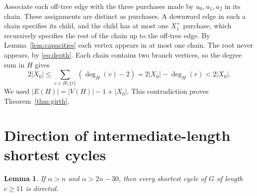 \documentclass[11pt]{article}
\newtheorem{lemma}[theorem]{Lemma}
\newcommand{\abs}[1]{\left|#1\right|}
\begin{document}
Associate each off-tree edge with the three purchases made
by \(u_0,u_1,u_2\) in its chain. These assignments are distinct
as purchases. A downward edge in such a chain specifies its child,
and the child has at most one \(X_1^+\) purchase, which recursively
specifies the rest of the chain up to the off-tree edge. By
Lemma~\ref{lem:capacities} each vertex appears in at most one chain.
The root never appears, by \eqref{eq:depth}. Each chain contains
two branch vertices, so the degree sum in \(H\) gives
\[
 2\abs{X_0} \le \sum_{v\in H\setminus\{r\}}(\deg_H(v)-2)
 =2\abs{X_0}-\deg_H(r)<2\abs{X_0}.
\]
We used \(\abs{E(H)}=\abs{V(H)}-1+\abs{X_0}\).
This contradiction proves Theorem~\ref{thm:girth}.

\section{Direction of intermediate-length shortest cycles}

\begin{lemma}\label{lem:orientation}
If \(\alpha>n\) and \(\alpha>2n-30\), then every shortest cycle
of \(G\) of length \(c\ge11\) is directed.
\end{lemma}
\end{document}
